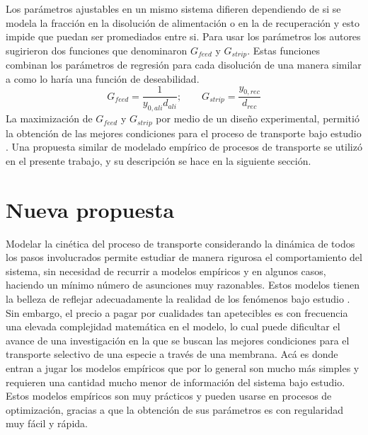 Los parámetros ajustables en un mismo sistema difieren dependiendo de si se modela la fracción en la disolución de alimentación o en la de recuperación y esto impide que puedan ser promediados entre si. Para usar los parámetros los autores sugirieron dos funciones que denominaron $G_{feed}$ y $G_{strip}$. Estas funciones combinan los parámetros de regresión para cada disolución de una manera similar a como lo haría una función de deseabilidad.
\begin{equation}
    G_{feed}=\frac{1}{y_{0,ali}d_{ali}};\qquad G_{strip}=\frac{y_{0,rec}}{d_{rec}}
\end{equation}
La maximización de $G_{feed}$ y $G_{strip}$ por medio de un diseño experimental, permitió la obtención de las mejores condiciones para el proceso de transporte bajo estudio \citep{RODRIGUEZDESANMIGUEL2014}. Una propuesta similar de modelado empírico de procesos de transporte se utilizó en el presente trabajo, y su descripción se hace en la siguiente sección.

\section{Nueva propuesta}
Modelar la cinética del proceso de transporte considerando la dinámica de todos los pasos involucrados permite estudiar de manera rigurosa el comportamiento del sistema, sin necesidad de recurrir a modelos empíricos y en algunos casos, haciendo un mínimo número de asunciones muy razonables. Estos modelos tienen la belleza de reflejar adecuadamente la realidad de los fenómenos bajo estudio \citep{MAKINO199085}. Sin embargo, el precio a pagar por cualidades tan apetecibles es con frecuencia una elevada complejidad matemática en el modelo, lo cual puede dificultar el avance de una investigación en la que se buscan las mejores condiciones para el transporte selectivo de una especie a través de una membrana. Acá es donde entran a jugar los modelos empíricos que por lo general son mucho más simples y requieren una cantidad mucho menor de información del sistema bajo estudio. Estos modelos empíricos son muy prácticos y pueden usarse en procesos de optimización, gracias a que la obtención de sus parámetros es con regularidad muy fácil y rápida. 


